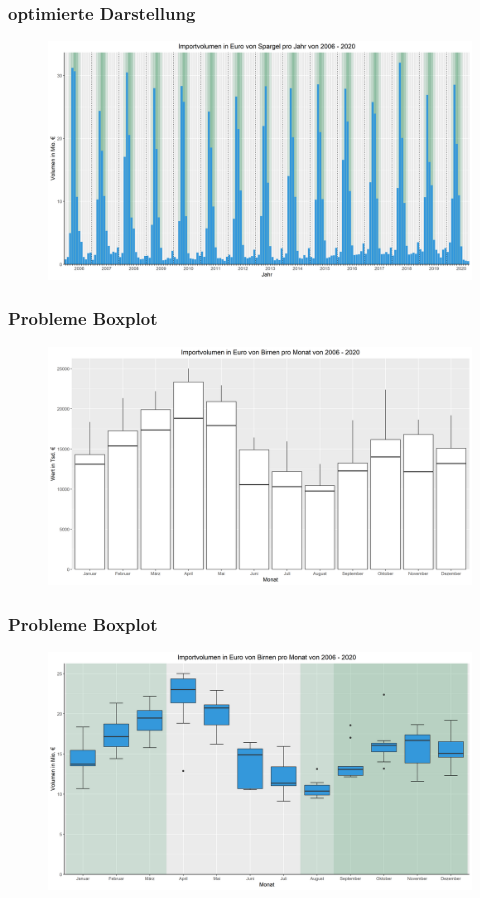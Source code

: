 \documentclass{beamer}
\begin{document}
\begin{frame}
	\frametitle{optimierte Darstellung}
	\begin{figure}[b]
		\centering
		\includegraphics[scale=0.35]{Marco_4_Folie}
	\end{figure}
\end{frame}

\begin{frame}
	\frametitle{Probleme Boxplot}
	\begin{figure}[b]
		\centering
		\includegraphics[scale=0.35]{Marco_5_Folie_1}
	\end{figure}
\end{frame}

\begin{frame}
	\frametitle{Probleme Boxplot}
	\begin{figure}[b]
		\centering
		\includegraphics[scale=0.35]{Marco_5_Folie_2}
	\end{figure}
\end{frame}
\end{document}
